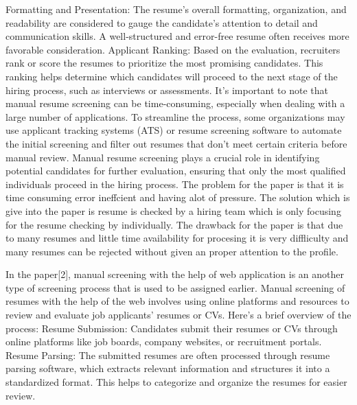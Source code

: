 \documentclass[12 pt, oneside]{book}
\begin{document}
\newline
Formatting and Presentation: The resume's overall formatting, organization, and readability are considered to gauge the candidate's attention to detail and communication skills. A well-structured and error-free resume often receives more favorable consideration.
\newline
Applicant Ranking: Based on the evaluation, recruiters rank or score the resumes to prioritize the most promising candidates. This ranking helps determine which candidates will proceed to the next stage of the hiring process, such as interviews or assessments.
\newline
It's important to note that manual resume screening can be time-consuming, especially when dealing with a large number of applications. To streamline the process, some organizations may use applicant tracking systems (ATS) or resume screening software to automate the initial screening and filter out resumes that don't meet certain criteria before manual review.
\newline
Manual resume screening plays a crucial role in identifying potential candidates for further evaluation, ensuring that only the most qualified individuals proceed in the hiring process.
The problem for the paper is that it is time consuming error ineffcient and having alot of pressure. The solution which is give into the paper is resume is checked by a hiring team which is only focusing for the resume checking by individually. The drawback for the paper is that due to many resumes and little time availability for procesing it is very diffliculty and many resumes can be rejected without given an proper attention to the profile.
\bigskip
\par In the paper[2], manual screening with the help of web application is an another type of screening process that is used to be assigned earlier. Manual screening of resumes with the help of the web involves using online platforms and resources to review and evaluate job applicants' resumes or CVs. Here's a brief overview of the process:
\newline
Resume Submission: Candidates submit their resumes or CVs through online platforms like job boards, company websites, or recruitment portals.
\newline
Resume Parsing: The submitted resumes are often processed through resume parsing software, which extracts relevant information and structures it into a standardized format. This helps to categorize and organize the resumes for easier review.
\newline
\end{document}
